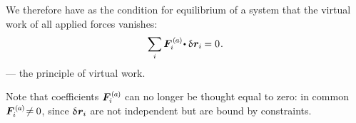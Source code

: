 We therefore have as the condition for equilibrium of a system that the virtual work of all applied forces vanishes:
\[
\displaystyle\sum_{\smash{i}} \bm{F}_{i}^{\smthactive} \hspace{-0.25ex} \dotp \variation{\hspace{.1ex}\locationvector_i} \hspace{-0.1ex} = 0
\hspace{.15ex} .
\]
--- the principle of virtual work.

Note that coefficients ${\bm{F}_{i}^{\smthactive}}$ can no longer be thought equal to zero: in common ${\bm{F}_{i}^{\smthactive} \hspace{-0.3ex} \neq \hspace{-0.1ex} 0}$, since ${\variation{\hspace{.1ex}\locationvector_i}}$ are not independent but are bound by constraints.

